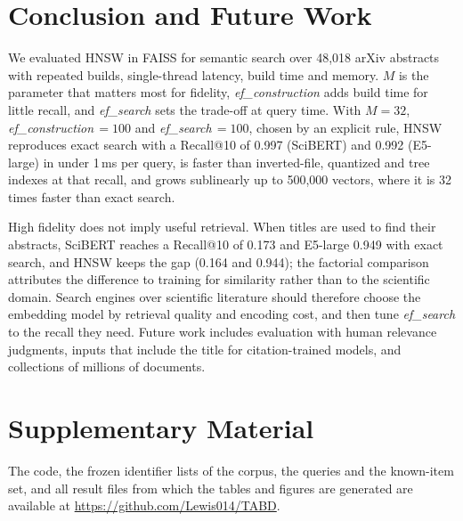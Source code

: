 \documentclass[conference, letterpaper]{IEEEtran}
\newif\ifblind
\newcommand{\efc}{\textit{ef\_construction}}
\newcommand{\efs}{\textit{ef\_search}}
\begin{document}
\section{Conclusion and Future Work}
\label{sec:conclusion}

We evaluated HNSW in FAISS for semantic search over 48,018 arXiv abstracts with repeated builds, single-thread latency, build time and memory. $M$ is the parameter that matters most for fidelity, \efc{} adds build time for little recall, and \efs{} sets the trade-off at query time. With $M=32$, \efc{}$\,=100$ and \efs{}$\,=100$, chosen by an explicit rule, HNSW reproduces exact search with a Recall@10 of 0.997 (SciBERT) and 0.992 (E5-large) in under 1\,ms per query, is faster than inverted-file, quantized and tree indexes at that recall, and grows sublinearly up to 500,000 vectors, where it is 32 times faster than exact search.

High fidelity does not imply useful retrieval. When titles are used to find their abstracts, SciBERT reaches a Recall@10 of 0.173 and E5-large 0.949 with exact search, and HNSW keeps the gap (0.164 and 0.944); the factorial comparison attributes the difference to training for similarity rather than to the scientific domain. Search engines over scientific literature should therefore choose the embedding model by retrieval quality and encoding cost, and then tune \efs{} to the recall they need. Future work includes evaluation with human relevance judgments, inputs that include the title for citation-trained models, and collections of millions of documents.

\section*{Supplementary Material}

\ifblind
The code, the frozen identifier lists of the corpus, the queries and the known-item set, and all result files from which the tables and figures are generated will be made publicly available upon acceptance. They have been withheld from this version to preserve the anonymity of the double-blind review.
\else
The code, the frozen identifier lists of the corpus, the queries and the known-item set, and all result files from which the tables and figures are generated are available at \url{https://github.com/Lewis014/TABD}.
\fi
\end{document}
